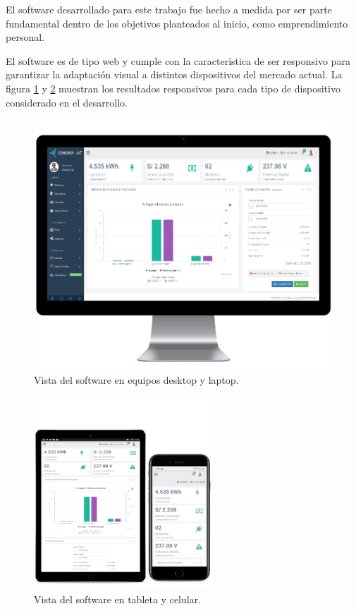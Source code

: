 El software desarrollado para este trabajo fue hecho a medida por ser parte fundamental dentro de los objetivos planteados al inicio, como emprendimiento personal. 

El software es de tipo web y cumple con la característica de ser responsivo para garantizar la adaptación visual a distintos dispositivos del mercado actual. La figura \ref{fig:software1} y \ref{fig:software2} muestran los resultados responsivos para cada tipo de dispositivo considerado en el desarrollo.

\begin{figure}[htpb]
\centering 
\includegraphics[width=0.65 \textwidth]{./Figures/responsive1.png}
\caption{Vista del software en equipos desktop y laptop.}
\label{fig:software1}
\end{figure}

\vspace{1.0cm}
\begin{figure}[htpb]
\centering 
\includegraphics[width=0.6\textwidth]{./Figures/responsive2.png}
\caption{Vista del software en tableta y celular.}
\label{fig:software2}
\end{figure}


